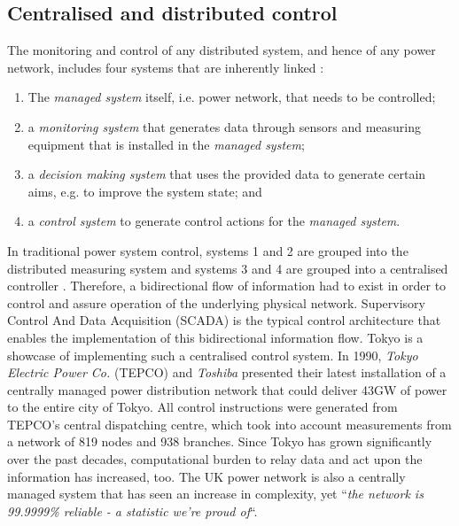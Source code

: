 \subsection{Centralised and distributed control}
\label{ch-literature:subsec:centralised-and-distributed-control}

The monitoring and control of any distributed system, and hence of any power network, includes four systems that are inherently linked \cite{Mansouri-Samani1993}:

\begin{enumerate}
	\item The \textit{managed system} itself, i.e. power network, that needs to be controlled;
	\item a \textit{monitoring system} that generates data through sensors and measuring equipment that is installed in the \textit{managed system};
	\item a \textit{decision making system} that uses the provided data to generate certain aims, e.g. to improve the system state; and
	\item a \textit{control system} to generate control actions for the \textit{managed system}.
\end{enumerate}


In traditional power system control, systems 1 and 2 are grouped into the distributed measuring system and systems 3 and 4 are grouped into a centralised controller \cite{Nelson1985}.
Therefore, a bidirectional flow of information had to exist in order to control and assure operation of the underlying physical network.
Supervisory Control And Data Acquisition (SCADA) is the typical control architecture that enables the implementation of this bidirectional information flow.
Tokyo is a showcase of implementing such a centralised control system.
In 1990, \textit{Tokyo Electric Power Co.} (TEPCO) and \textit{Toshiba} presented their latest installation of a centrally managed power distribution network that could deliver 43GW of power to the entire city of Tokyo.
All control instructions were generated from TEPCO's central dispatching centre, which took into account measurements from a network of 819 nodes and 938 branches.
Since Tokyo has grown significantly over the past decades, computational burden to relay data and act upon the information has increased, too.
The UK power network is also a centrally managed system that has seen an increase in complexity, yet ``\textit{the network is 99.9999\% reliable - a statistic we're proud of}``\cite{NationalGrid2017}.



